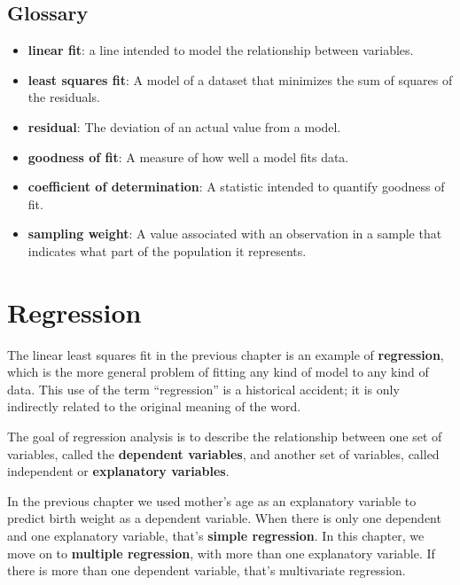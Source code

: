 \documentclass[12pt]{book}
\begin{document}
\section{Glossary}

\begin{itemize}

\item {\bf linear fit}: a line intended to model the relationship between
variables.  

\item {\bf least squares fit}: A model of a dataset that minimizes the
sum of squares of the residuals.

\item {\bf residual}: The deviation of an actual value from a model.

\item {\bf goodness of fit}: A measure of how well a model fits data.

\item {\bf coefficient of determination}: A statistic intended to
quantify goodness of fit.

\item {\bf sampling weight}: A value associated with an observation in a
  sample that indicates what part of the population it represents.

\end{itemize}



\chapter{Regression}
\label{regression}

The linear least squares fit in the previous chapter is an example of
{\bf regression}, which is the more general problem of fitting any
kind of model to any kind of data.  This use of the term ``regression''
is a historical accident; it is only indirectly related to the
original meaning of the word.

The goal of regression analysis is to describe the relationship
between one set of variables, called the {\bf dependent variables},
and another set of variables, called independent or {\bf
  explanatory variables}.

In the previous chapter we used mother's age as an explanatory
variable to predict birth weight as a dependent variable.  When there
is only one dependent and one explanatory variable, that's {\bf
  simple regression}.  In this chapter, we move on to {\bf multiple
  regression}, with more than one explanatory variable.  If there is
more than one dependent variable, that's multivariate
regression.
\end{document}
